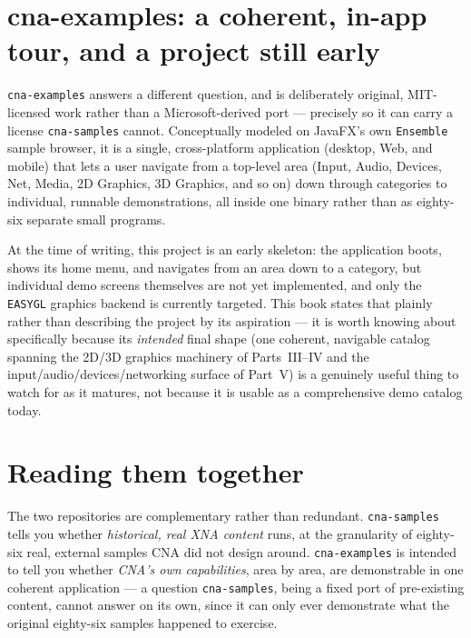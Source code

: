 \section{cna-examples: a coherent, in-app tour, and a project still early}

\texttt{cna-examples} answers a different question, and is deliberately original,
MIT-licensed work rather than a Microsoft-derived port --- precisely so it can carry a
license \texttt{cna-samples} cannot. Conceptually modeled on JavaFX's own \texttt{Ensemble}
sample browser, it is a single, cross-platform application (desktop, Web, and mobile) that
lets a user navigate from a top-level area (Input, Audio, Devices, Net, Media, 2D Graphics,
3D Graphics, and so on) down through categories to individual, runnable demonstrations, all
inside one binary rather than as eighty-six separate small programs.

At the time of writing, this project is an early skeleton: the application boots, shows its
home menu, and navigates from an area down to a category, but individual demo screens
themselves are not yet implemented, and only the \texttt{EASYGL} graphics backend is
currently targeted. This book states that plainly rather than describing the project by its
aspiration --- it is worth knowing about specifically because its \emph{intended} final shape
(one coherent, navigable catalog spanning the 2D/3D graphics machinery of Parts~III--IV and
the input/audio/devices/networking surface of Part~V) is a genuinely useful thing to watch for
as it matures, not because it is usable as a comprehensive demo catalog today.

\section{Reading them together}

The two repositories are complementary rather than redundant. \texttt{cna-samples} tells you
whether \emph{historical, real XNA content} runs, at the granularity of eighty-six real,
external samples CNA did not design around. \texttt{cna-examples} is intended to tell you
whether \emph{CNA's own capabilities}, area by area, are demonstrable in one coherent
application --- a question \texttt{cna-samples}, being a fixed port of pre-existing content,
cannot answer on its own, since it can only ever demonstrate what the original eighty-six
samples happened to exercise.
